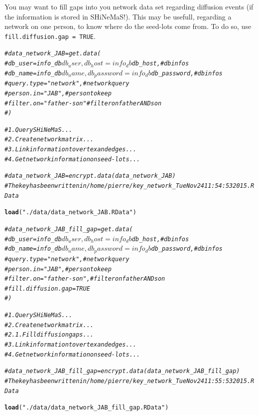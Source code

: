 \documentclass{article}\usepackage[]{graphicx}\usepackage[]{color}
\makeatletter
\newcommand{\hlstr}[1]{\textcolor[rgb]{0.192,0.494,0.8}{#1}}%
\newcommand{\hlcom}[1]{\textcolor[rgb]{0.678,0.584,0.686}{\textit{#1}}}%
\newcommand{\hlstd}[1]{\textcolor[rgb]{0.345,0.345,0.345}{#1}}%
\newcommand{\hlkwd}[1]{\textcolor[rgb]{0.737,0.353,0.396}{\textbf{#1}}}%
\newenvironment{kframe}{%
 \def\at@end@of@kframe{}%
 \ifinner\ifhmode%
  \def\at@end@of@kframe{\end{minipage}}%
  \begin{minipage}{\columnwidth}%
 \fi\fi%
 \def\FrameCommand##1{\hskip\@totalleftmargin \hskip-\fboxsep
 \colorbox{shadecolor}{##1}\hskip-\fboxsep
     \hskip-\linewidth \hskip-\@totalleftmargin \hskip\columnwidth}%
 \MakeFramed {\advance\hsize-\width
   \@totalleftmargin\z@ \linewidth\hsize
   \@setminipage}}%
 {\par\unskip\endMakeFramed%
 \at@end@of@kframe}
\newenvironment{knitrout}{}{} %
\newcommand{\BD}{SHiNeMaS}
\makeatother
\begin{document}
You may want to fill gaps into you network data set regarding diffusion events (if the information is stored in \BD!).
This may be usefull, regarding a network on one person, to know where do the seed-lots come from.
To do so, use \texttt{fill.diffusion.gap = TRUE}.

\begin{knitrout}
\color{fgcolor}\begin{kframe}
\begin{alltt}
\hlcom{#data_network_JAB = get.data(}
\hlcom{#	db_user = info_db$db_user, db_host = info_db$db_host, # db infos}
\hlcom{#	db_name = info_db$db_name, db_password = info_db$db_password,  # db infos}
\hlcom{#	query.type = "network", # network query}
\hlcom{#	person.in = "JAB", # person to keep}
\hlcom{#	filter.on = "father-son" # filter on father AND son}
\hlcom{#	)}

\hlcom{# 1. Query SHiNeMaS ...}
\hlcom{# 2. Create network matrix ...}
\hlcom{# 3. Link information to vertex and edges ...}
\hlcom{# 4. Get network information on seed-lots ...}

\hlcom{#data_network_JAB = encrypt.data(data_network_JAB)}
\hlcom{# The key has been written in /home/pierre/key_network_Tue Nov 24 11:54:53 2015.RData}

\hlkwd{load}\hlstd{(}\hlstr{"./data/data_network_JAB.RData"}\hlstd{)}
\end{alltt}
\end{kframe}
\end{knitrout}

\begin{knitrout}
\color{fgcolor}\begin{kframe}
\begin{alltt}
\hlcom{#data_network_JAB_fill_gap = get.data(}
\hlcom{#	db_user = info_db$db_user, db_host = info_db$db_host, # db infos}
\hlcom{#	db_name = info_db$db_name, db_password = info_db$db_password, # db infos}
\hlcom{#	query.type = "network", # network query}
\hlcom{#	person.in = "JAB", # person to keep}
\hlcom{#	filter.on = "father-son", # filter on father AND son}
\hlcom{#	fill.diffusion.gap = TRUE}
\hlcom{#	)}

\hlcom{# 1. Query SHiNeMaS ...}
\hlcom{# 2. Create network matrix ...}
\hlcom{# 2.1. Fill diffusion gaps ...}
\hlcom{# 3. Link information to vertex and edges ...}
\hlcom{# 4. Get network information on seed-lots ...}

\hlcom{#data_network_JAB_fill_gap = encrypt.data(data_network_JAB_fill_gap)}
\hlcom{# The key has been written in /home/pierre/key_network_Tue Nov 24 11:55:53 2015.RData}

\hlkwd{load}\hlstd{(}\hlstr{"./data/data_network_JAB_fill_gap.RData"}\hlstd{)}
\end{alltt}
\end{kframe}
\end{knitrout}
\end{document}
